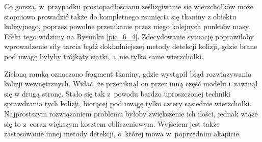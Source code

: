 		
		Co gorsza, w~przypadku prostopadłościanu ześlizgiwanie się wierzchołków może stopniowo prowadzić także do kompletnego zsunięcia się tkaniny z obiektu kolizyjnego, poprzez powolne przenikanie przez niego kolejnych punktów masy. Efekt tego widzimy na Rysunku \ref{pic_6_4}. Zdecydowanie sytuację poprawiłoby wprowadzenie siły tarcia bądź dokładniejszej metody detekcji kolizji, gdzie brane pod uwagę byłyby trójkąty siatki, a~nie tylko same wierzchołki.
		
		Zieloną ramką oznaczono fragment tkaniny, gdzie wystąpił błąd rozwiązywania kolizji wewnętrznych. Widać, że przeniknął on przez inną część modelu i~zawinął się w drugą stronę. Stało się tak z~powodu bardzo uproszczonej techniki sprawdzania tych kolizji, biorącej pod uwagę tylko cztery sąsiednie wierzchołki. Najprostszym rozwiązaniem problemu byłoby zwiększenie ich ilości, jednak wiąże się to z~coraz większym kosztem obliczeniowym. Wyjściem jest także zastosowanie innej metody detekcji, o~której mowa w~poprzednim akapicie.
			
			
			
